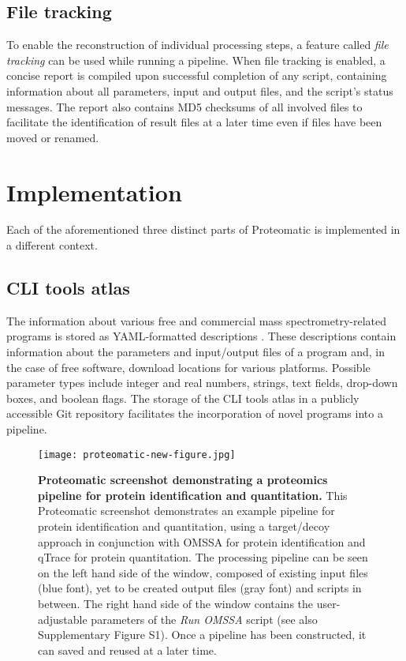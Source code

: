 \subsection{File tracking}

To enable the reconstruction of individual processing steps, a feature 
called {\em file tracking} can be used while running a pipeline. 
When file tracking is enabled, a concise report is compiled upon successful 
completion of any script, containing information about all parameters, input
and output files, and the script's status messages. The report also 
contains MD5 checksums of all involved files to facilitate the identification 
of result files at a later time even if files have been moved or renamed.

\section{Implementation}

Each of the aforementioned three distinct parts of Proteomatic is implemented in 
a different context.

\subsection{CLI tools atlas}

The information about various free and commercial mass spectrometry-related 
programs is stored as YAML-formatted descriptions \cite[]{ben-kiki_yaml_2005}.
These descriptions contain information about the parameters and input/output 
files of a program and, in the case of free software, download locations for 
various platforms. 
Possible parameter types include integer and real numbers, strings, text 
fields, drop-down boxes, and boolean flags.
The storage of the CLI tools atlas in a publicly accessible Git repository
facilitates the incorporation of novel programs into a pipeline.

\begin{figure*}
\texttt{[image: proteomatic-new-figure.jpg]}
\caption{
    {\bf Proteomatic screenshot demonstrating a proteomics pipeline for
    protein identification and quantitation.}
    This Proteomatic screenshot demonstrates an example pipeline for protein 
    identification and quantitation, using a target/decoy approach in 
    conjunction with OMSSA for protein identification and qTrace for protein 
    quantitation. 
    The processing pipeline can be seen on the left hand side of the window, 
    composed of existing input files (blue font), yet to be created output 
    files (gray font) and scripts in between. The right hand side of the window 
    contains the user-adjustable parameters of the {\em Run OMSSA} script 
    (see also Supplementary Figure S1).
    Once a pipeline has been constructed, it can saved and reused at a later
    time.
}
\label{fig:pipeline}
\end{figure*}

